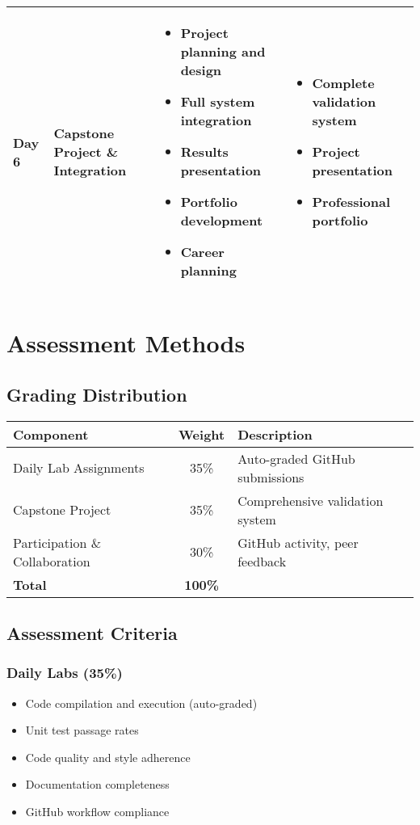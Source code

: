 \documentclass[11pt,a4paper]{article}
\begin{document}
\begin{longtable}{|p{1.5cm}|p{4cm}|p{6cm}|p{3cm}|}
\textbf{Day 6} & Capstone Project \& Integration &
\begin{itemize}[nosep]
    \item Project planning and design
    \item Full system integration
    \item Results presentation
    \item Portfolio development
    \item Career planning
\end{itemize} &
\begin{itemize}[nosep]
    \item Complete validation system
    \item Project presentation
    \item Professional portfolio
\end{itemize} \\
\hline

\end{longtable}

\section{Assessment Methods}

\subsection{Grading Distribution}
\begin{center}
\begin{tabular}{|l|c|l|}
\hline
\textbf{Component} & \textbf{Weight} & \textbf{Description} \\
\hline
Daily Lab Assignments & 35\% & Auto-graded GitHub submissions \\
Capstone Project & 35\% & Comprehensive validation system \\
Participation \& Collaboration & 30\% & GitHub activity, peer feedback \\
\hline
\textbf{Total} & \textbf{100\%} & \\
\hline
\end{tabular}
\end{center}

\subsection{Assessment Criteria}

\subsubsection{Daily Labs (35\%)}
\begin{itemize}
    \item Code compilation and execution (auto-graded)
    \item Unit test passage rates
    \item Code quality and style adherence
    \item Documentation completeness
    \item GitHub workflow compliance
\end{itemize}
\end{document}
